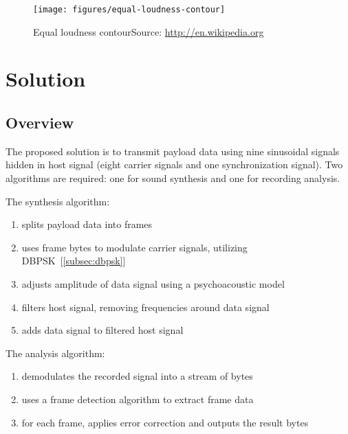 \documentclass[english,bachelor,a4paper,oneside]{ppfcmthesis}
\begin{document}
\begin{figure}[p]
  \centering
  \texttt{[image: figures/equal-loudness-contour]}
  \caption[Equal loudness contour]{Equal loudness contour\newline Source: \url{http://en.wikipedia.org}}
  \label{fig:equal-loudness}
\end{figure}


\chapter{Solution}
\label{chap:solution}

\section{Overview}

The proposed solution is to transmit payload data using nine sinusoidal signals hidden in host signal (eight carrier signals and one synchronization signal). Two algorithms are required: one for sound synthesis and one for recording analysis.

The synthesis algorithm:
\begin{enumerate}
\item splits payload data into frames
\item uses frame bytes to modulate carrier signals, utilizing DBPSK~[\ref{subsec:dbpsk}]
\item adjusts amplitude of data signal using a psychoacoustic model
\item filters host signal, removing frequencies around data signal
\item adds data signal to filtered host signal
\end{enumerate}

The analysis algorithm:
\begin{enumerate}
\item demodulates the recorded signal into a stream of bytes
\item uses a frame detection algorithm to extract frame data
\item for each frame, applies error correction and outputs the result bytes
\end{enumerate}
\end{document}
